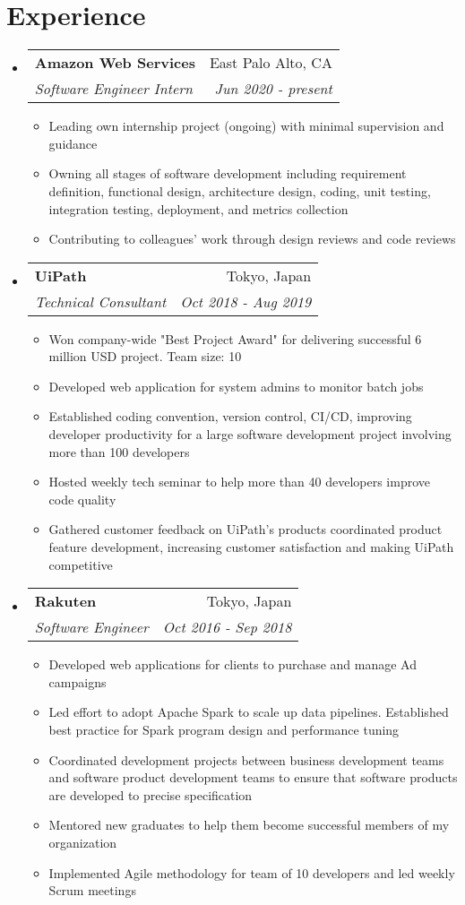 \documentclass[letterpaper,11pt]{article}
\makeatletter
\newcommand{\bulletItem}[1]{
  \item\small{
    {#1 \vspace{-2pt}}
  }
}
\newcommand{\resumeSubheading}[4]{
  \vspace{-1pt}\item[]
    \begin{tabular*}{0.97\textwidth}[t]{l@{\extracolsep{\fill}}r}
      \textbf{#1} & #2 \\
      \textit{\small#3} & \textit{\small #4} \\
    \end{tabular*}\vspace{-5pt}
}
\newcommand{\resumeSubHeadingListStart}{\begin{itemize}[leftmargin=0pt]}
\newcommand{\resumeSubHeadingListEnd}{\end{itemize}}
\makeatother
\begin{document}
\section{Experience}
  \resumeSubHeadingListStart
    \resumeSubheading
    {Amazon Web Services}{East Palo Alto, CA}
    {Software Engineer Intern}{Jun 2020 - present}
    \begin{itemize} 
      \bulletItem {Leading own internship project (ongoing) with minimal supervision and guidance}
      \bulletItem {Owning all stages of software development including requirement definition, functional design, architecture design, coding, unit testing, integration testing, deployment, and metrics collection}
      \bulletItem {Contributing to colleagues' work through design reviews and code reviews}
    \end{itemize}

    \resumeSubheading
      {UiPath}{Tokyo, Japan}
      {Technical Consultant}{Oct 2018 - Aug 2019}
      \begin{itemize} 
        \bulletItem {Won company-wide "Best Project Award" for delivering successful 6 million USD project. Team size: 10}
        \bulletItem {Developed web application for system admins to monitor batch jobs}
        \bulletItem {Established coding convention, version control, CI/CD, improving developer productivity for a large software development project involving more than 100 developers}
        \bulletItem {Hosted weekly tech seminar to help more than 40 developers improve code quality}
        \bulletItem {Gathered customer feedback on UiPath's products coordinated product feature development, increasing customer satisfaction and making UiPath competitive}
      \end{itemize}

    \resumeSubheading
      {Rakuten}{Tokyo, Japan}
      {Software Engineer}{Oct 2016 - Sep 2018}
      \begin{itemize} 
        \bulletItem {Developed web applications for clients to purchase and manage Ad campaigns}
        \bulletItem {Led effort to adopt Apache Spark to scale up data pipelines. Established best practice for Spark program design and performance tuning}
        \bulletItem {Coordinated development projects between business development teams and software product development teams to ensure that software products are developed to precise specification}
        \bulletItem {Mentored new graduates to help them become successful members of my organization}
        \bulletItem {Implemented Agile methodology for team of 10 developers and led weekly Scrum meetings}
      \end{itemize}
  \resumeSubHeadingListEnd
\end{document}
